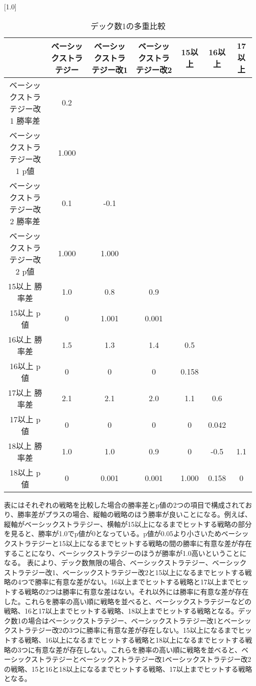 \begin{table}[H]
 \begin{center}
 \small
 \scalebox{0.8}[1.0]{
  \begin{tabular}{|c|c|c|c|c|c|c|}
    \hline & ベーシックストラテジー & ベーシックストラテジー改1 & ベーシックストラテジー改2 & 15以上 & 16以上 & 17以上 \\
    \hline ベーシックストラテジー改1 勝率差 & 0.2 &  &  &  &  &   \\
    ベーシックストラテジー改1 p値 & 1.000 &  &  &  &  &    \\
    \hline ベーシックストラテジー改2 勝率差 & 0.1 & -0.1 & & & &  \\
    ベーシックストラテジー改2 p値 & 1.000 & 1.000 & & & &   \\
    \hline 15以上 勝率差 & 1.0 & 0.8 & 0.9 & & &   \\
    15以上 p値 & 0 & 1.001 & 0.001 & & &  \\
    \hline 16以上 勝率差 & 1.5 & 1.3 & 1.4 & 0.5 & &  \\
    16以上 p値 & 0 & 0 & 0 & 0.158 & &  \\
    \hline 17以上 勝率差 & 2.1 & 2.1 & 2.0 & 1.1 & 0.6 &  \\
    17以上 p値 & 0 & 0 & 0 & 0 & 0.042 & \\
    \hline 18以上 勝率差 & 1.0 & 1.0 & 0.9 & 0 & -0.5 & 1.1  \\
    18以上 p値 & 0 & 0.001 & 0.001 & 1.000 & 0.158 & 0  \\
    \hline
  \end{tabular}
 }
 \end{center}
 \caption{デック数1の多重比較}
\end{table}
表にはそれぞれの戦略を比較した場合の勝率差とp値の2つの項目で構成されており、勝率差がプラスの場合、縦軸の戦略のほう勝率が良いことになる。例えば、縦軸がベーシックストラテジー、横軸が15以上になるまでヒットする戦略の部分を見ると、勝率が1.0でp値が0となっている。p値が0.05より小さいためベーシックストラテジーと15以上になるまでヒットする戦略の間の勝率に有意な差が存在することになり、ベーシックストラテジーのほうが勝率が1.0高いということになる。
表により、デック数無限の場合、ベーシックストラテジー、ベーシックストラテジー改1、ベーシックストラテジー改2と15以上になるまでヒットする戦略の4つで勝率に有意な差がない。16以上までヒットする戦略と17以上までヒットする戦略の2つは勝率に有意な差はない。それ以外には勝率に有意な差が存在した。これらを勝率の高い順に戦略を並べると、ベーシックストラテジーなどの戦略、16と17以上までヒットする戦略、18以上までヒットする戦略となる。デック数1の場合はベーシックストラテジー、ベーシックストラテジー改1とベーシックストラテジー改2の3つに勝率に有意な差が存在しない。15以上になるまでヒットする戦略、16以上になるまでヒットする戦略と18以上になるまでヒットする戦略の3つに有意な差が存在しない。これらを勝率の高い順に戦略を並べると、ベーシックストラテジーとベーシックストラテジー改1ベーシックストラテジー改2の戦略、15と16と18以上になるまでヒットする戦略、17以上までヒットする戦略となる。
